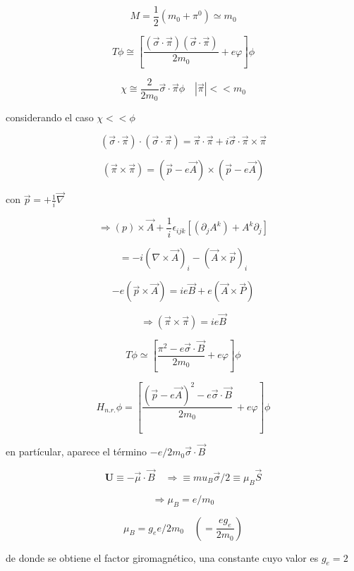 \documentclass{report}
\begin{document}
\[M = \frac{1}{2} (m_0 + \pi^0 ) \simeq m_0 \]

\[T \phi \cong [\frac{(\overrightarrow{\sigma} \cdot \overrightarrow{\pi})(\overrightarrow{\sigma} \cdot \overrightarrow{\pi})}{2 m_0 } + e \varphi ] \phi \]

\[\chi \cong \frac{2}{2 m_0 } \overrightarrow{ \sigma} \cdot \overrightarrow{\pi} \phi \quad |\overrightarrow{\pi}|<<m_0 \]

considerando el caso $\chi << \phi $

\[(\overrightarrow{\sigma} \cdot \overrightarrow{\pi}) \cdot (\overrightarrow{\sigma} \cdot \overrightarrow{\pi}) = \overrightarrow{\pi} \cdot \overrightarrow{\pi} + i \overrightarrow{\sigma} \cdot \overrightarrow{\pi} \times \overrightarrow{\pi }\]

\[(\overrightarrow{\pi} \times \overrightarrow{\pi}) = (\overrightarrow{p} -e \overrightarrow{A}) \times (\overrightarrow{p} -e \overrightarrow{A}) \]

con $\overrightarrow{p} = + \frac{1}{i} \overrightarrow{\nabla }$

\[\Rightarrow(p) \times \overrightarrow{A} + \frac{1}{i} \epsilon_{ijk} [(\partial_j A^k )+A^k \partial _j ] \]

\[= - i (\nabla \times \overrightarrow{A})_i - (\overrightarrow{A} \times \overrightarrow{p})_i \]

\[-e (\overrightarrow{p} \times \overrightarrow{A}) = ie\overrightarrow{B} + e (\overrightarrow{A} \times \overrightarrow{P})\]

\[\Rightarrow (\overrightarrow{\pi} \times \overrightarrow{\pi}) = ie \overrightarrow{B}\]

\[T \phi \simeq [\frac{\pi^2 - e \overrightarrow{\sigma} \cdot \overrightarrow{B}}{2 m_0 } + e \varphi] \phi \]

\[H _{n.r.} \phi = [\frac{(\overrightarrow{p}-e\overrightarrow{A})^2-e \overrightarrow{\sigma} \cdot \overrightarrow{B}}{2m_0 }\ + e \varphi] \phi \] 

en partícular, aparece el término $- e/2m_0 \overrightarrow{\sigma} \cdot \overrightarrow{B}$

\[\textbf{U} \equiv - \overrightarrow{\mu} \cdot \overrightarrow{B} \quad \Rightarrow \equiv mu_{B} \overrightarrow{\sigma}/2 \equiv \mu_{B} \overrightarrow{S}\]

\[\Rightarrow \mu_{B} = e/m_0 \]

\[\mu_{B} = g_e e/2m_0 \quad (= \frac{e g_e }{2m_0 })\]

de donde se obtiene el factor giromagnético, una constante cuyo valor es $g_e = 2$
\end{document}
